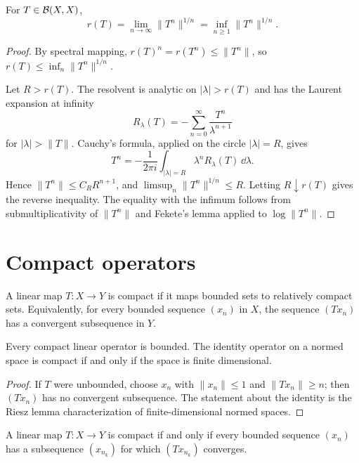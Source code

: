 \begin{notetheorem}
For $T\in\mathcal{B}(X,X)$,
\[
  r(T)=\lim_{n\to\infty}\|T^n\|^{1/n}
      =\inf_{n\ge1}\|T^n\|^{1/n}.
\]
\end{notetheorem}

\begin{proof}
By spectral mapping,
$r(T)^n=r(T^n)\le\|T^n\|$, so
$r(T)\le\inf_n\|T^n\|^{1/n}$.

Let $R>r(T)$.  The resolvent is analytic on $|\lambda|>r(T)$ and has the
Laurent expansion at infinity
\[
  R_\lambda(T)
  =-\sum_{n=0}^{\infty}\frac{T^n}{\lambda^{n+1}}
\]
for $|\lambda|>\|T\|$.  Cauchy's formula, applied on the circle
$|\lambda|=R$, gives
\[
  T^n=-\frac{1}{2\pi i}\int_{|\lambda|=R}
          \lambda^nR_\lambda(T)\,\dd\lambda.
\]
Hence $\|T^n\|\le C_RR^{n+1}$, and
$\limsup_n\|T^n\|^{1/n}\le R$.  Letting $R\downarrow r(T)$ gives the reverse
inequality.  The equality with the infimum follows from submultiplicativity of
$\|T^n\|$ and Fekete's lemma applied to $\log\|T^n\|$.
\end{proof}

\section{Compact operators}

\begin{notedefinition}
A linear map $T\colon X\to Y$ is compact if it maps bounded sets to relatively
compact sets.  Equivalently, for every bounded sequence
$(x_n)$ in $X$, the sequence $(Tx_n)$ has a convergent subsequence in $Y$.
\end{notedefinition}

\begin{notelemma}
Every compact linear operator is bounded.  The identity operator on a normed
space is compact if and only if the space is finite dimensional.
\end{notelemma}

\begin{proof}
If $T$ were unbounded, choose $x_n$ with $\|x_n\|\le1$ and $\|Tx_n\|\ge n$;
then $(Tx_n)$ has no convergent subsequence.  The statement about the identity
is the Riesz lemma characterization of finite-dimensional normed spaces.
\end{proof}

\begin{notetheorem}
A linear map $T\colon X\to Y$ is compact if and only if every bounded sequence
$(x_n)$ has a subsequence $(x_{n_k})$ for which $(Tx_{n_k})$ converges.
\end{notetheorem}

